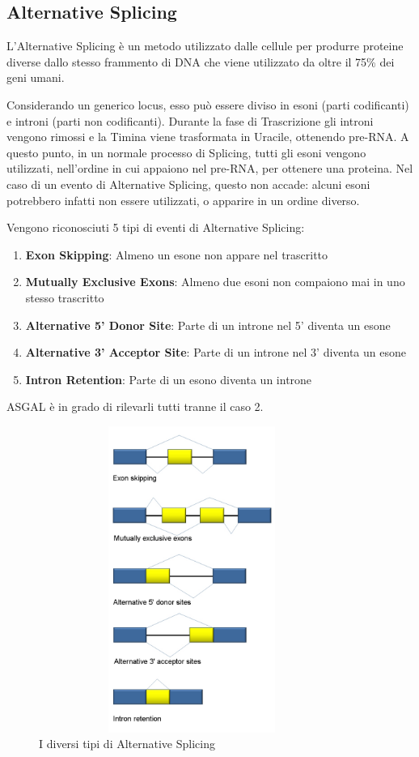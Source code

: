 \subsection{Alternative Splicing}

L'Alternative Splicing è un metodo utilizzato dalle cellule per produrre proteine diverse dallo stesso frammento di DNA che viene utilizzato da oltre il 75\% dei geni umani. 

Considerando un generico locus, esso può essere diviso in esoni (parti codificanti) e introni (parti non codificanti). Durante la fase di Trascrizione gli introni vengono rimossi e la Timina viene trasformata in Uracile, ottenendo pre-RNA. A questo punto, in un normale processo di Splicing, tutti gli esoni vengono utilizzati, nell'ordine in cui appaiono nel pre-RNA, per ottenere una proteina. Nel caso di un evento di Alternative Splicing, questo non accade: alcuni esoni potrebbero infatti non essere utilizzati, o apparire in un ordine diverso. 


Vengono riconosciuti 5 tipi di eventi di Alternative Splicing:

\begin{enumerate}
	\item \textbf{Exon Skipping}: Almeno un esone non appare nel trascritto
	\item \textbf{Mutually Exclusive Exons}: Almeno due esoni non compaiono mai in uno stesso trascritto
	\item \textbf{Alternative 5' Donor Site}: Parte di un introne nel 5' diventa un esone
	\item \textbf{Alternative 3' Acceptor Site}: Parte di un introne nel 3' diventa un esone
	\item \textbf{Intron Retention}: Parte di un esono diventa un introne
\end{enumerate}

ASGAL è in grado di rilevarli tutti tranne il caso 2.

\begin{figure}[h]
	\centering
	\includegraphics[height=10cm,width=10cm]{images/alternativesplicingevents.jpg}
  \caption{I diversi tipi di Alternative Splicing}
  \label{fig:AlternativeSplicingTypes}
\end{figure}